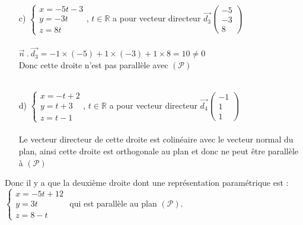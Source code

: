\documentclass[a4paper, 12pt]{article}
\begin{document}
\begin{itemize}
    \item[c)] $\begin{cases} x = -5t - 3 \\ y = -3t \\ z = 8t \end{cases}$, $t \in \mathbb{R}$ a pour vecteur directeur $\vec{d_3}\begin{pmatrix} -5 \\ -3 \\ 8 \end{pmatrix}$ \\ \\ 
        $\vec{n}\ .\ \vec{d_3} = -1 \times (-5) + 1 \times (-3) + 1 \times 8 = 10 \neq 0$ \\ 
        Donc cette droite n'est pas parallèle avec $(\mathcal{P})$\\ \\

    \item[d)] $\begin{cases} x = -t + 2 \\ y = t + 3 \\ z = t - 1 \end{cases}$, $t \in \mathbb{R}$ a pour vecteur directeur $\vec{d_4}\begin{pmatrix} -1 \\ 1 \\ 1 \end{pmatrix}$ \\ \\ 
    Le vecteur directeur de cette droite est colinéaire avec le vecteur normal du plan, ainsi cette droite est orthogonale au plan et donc ne peut être parallèle à $(\mathcal{P})$\\ 
\end{itemize}
Donc il y a que la deuxième droite dont une représentation paramétrique est : $\begin{cases} x = -5t + 12 \\ y = 3t \\ z = 8-t \end{cases}$ 
qui est parallèle au plan $(\mathcal{P})$.

{}
\end{document}
